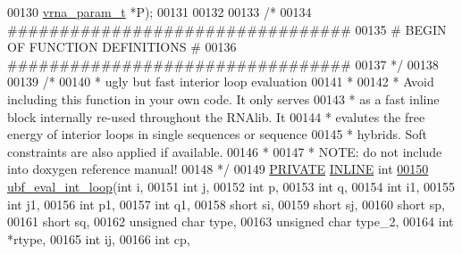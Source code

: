 \begin{DoxyCode}
00130                                 \mbox{\hyperlink{group__energy__parameters_structvrna__param__s}{vrna\_param\_t}}  *P);
00131 
00132 
00133 \textcolor{comment}{/*}
00134 \textcolor{comment}{ #################################}
00135 \textcolor{comment}{ # BEGIN OF FUNCTION DEFINITIONS #}
00136 \textcolor{comment}{ #################################}
00137 \textcolor{comment}{ */}
00138 
00139 \textcolor{comment}{/*}
00140 \textcolor{comment}{ *  ugly but fast interior loop evaluation}
00141 \textcolor{comment}{ *}
00142 \textcolor{comment}{ *  Avoid including this function in your own code. It only serves}
00143 \textcolor{comment}{ *  as a fast inline block internally re-used throughout the RNAlib. It}
00144 \textcolor{comment}{ *  evalutes the free energy of interior loops in single sequences or sequence}
00145 \textcolor{comment}{ *  hybrids. Soft constraints are also applied if available.}
00146 \textcolor{comment}{ *}
00147 \textcolor{comment}{ *  NOTE: do not include into doxygen reference manual!}
00148 \textcolor{comment}{ */}
00149 \mbox{\hyperlink{edit__cost_8h_a5e151c615eda34903514212f05a5ccf8}{PRIVATE}} \mbox{\hyperlink{interior__loops_8h_a2eb6f9e0395b47b8d5e3eeae4fe0c116}{INLINE}} \textcolor{keywordtype}{int}
\mbox{\hyperlink{group__loops_ga7023a0172febe830dfca95499d8d1bbb}{00150}} \mbox{\hyperlink{group__loops_ga7023a0172febe830dfca95499d8d1bbb}{ubf\_eval\_int\_loop}}(\textcolor{keywordtype}{int}           i,
00151                   \textcolor{keywordtype}{int}           j,
00152                   \textcolor{keywordtype}{int}           p,
00153                   \textcolor{keywordtype}{int}           q,
00154                   \textcolor{keywordtype}{int}           i1,
00155                   \textcolor{keywordtype}{int}           j1,
00156                   \textcolor{keywordtype}{int}           p1,
00157                   \textcolor{keywordtype}{int}           q1,
00158                   \textcolor{keywordtype}{short}         si,
00159                   \textcolor{keywordtype}{short}         sj,
00160                   \textcolor{keywordtype}{short}         sp,
00161                   \textcolor{keywordtype}{short}         sq,
00162                   \textcolor{keywordtype}{unsigned} \textcolor{keywordtype}{char} type,
00163                   \textcolor{keywordtype}{unsigned} \textcolor{keywordtype}{char} type\_2,
00164                   \textcolor{keywordtype}{int}           *rtype,
00165                   \textcolor{keywordtype}{int}           ij,
00166                   \textcolor{keywordtype}{int}           cp,

\end{DoxyCode}
